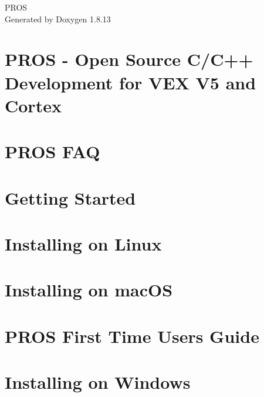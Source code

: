 \documentclass[twoside]{book}
\newcommand{\+}{\discretionary{\mbox{\scriptsize$\hookleftarrow$}}{}{}}
\newcommand{\clearemptydoublepage}{%
  \newpage{\pagestyle{empty}\cleardoublepage}%
}
\begin{document}
\hypersetup{pageanchor=false,
             bookmarksnumbered=true,
             pdfencoding=unicode
            }
\begin{titlepage}
\vspace*{7cm}
\begin{center}%
{\Large P\+R\+OS }\\
\vspace*{1cm}
{\large Generated by Doxygen 1.8.13}\\
\end{center}
\end{titlepage}
\clearemptydoublepage
{}
\tableofcontents
\clearemptydoublepage
{}
\hypersetup{pageanchor=true}

\chapter{P\+R\+OS -\/ Open Source C/\+C++ Development for V\+EX V5 and Cortex}
\label{index}\hypertarget{index}{}
\chapter{P\+R\+OS F\+AQ}
\label{autotoc_md0}

\chapter{Getting Started}
\label{autotoc_md2}

\chapter{Installing on Linux}
\label{autotoc_md5}

\chapter{Installing on mac\+OS}
\label{autotoc_md9}

\chapter{P\+R\+OS First Time Users Guide}
\label{autotoc_md17}

\chapter{Installing on Windows}
\label{autotoc_md21}

\end{document}

